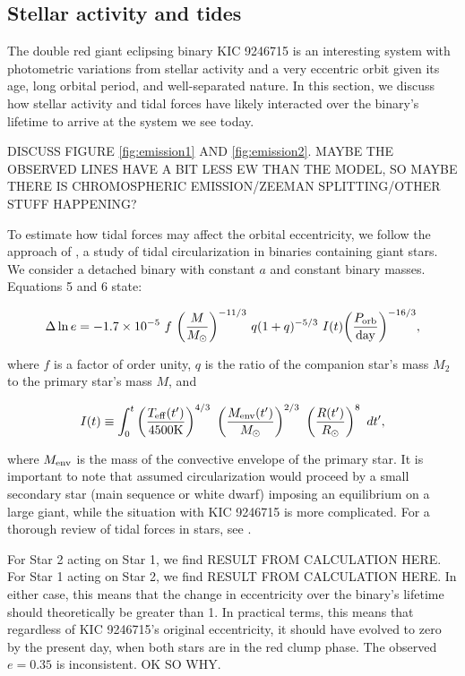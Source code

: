 \subsection{Stellar activity and tides}\label{context}
The double red giant eclipsing binary KIC 9246715 is an interesting system with photometric variations from stellar activity and a very eccentric orbit given its age, long orbital period, and well-separated nature. In this section, we discuss how stellar activity and tidal forces have likely interacted over the binary's lifetime to arrive at the system we see today.

DISCUSS FIGURE \ref{fig:emission1} AND \ref{fig:emission2}. MAYBE THE OBSERVED LINES HAVE A BIT LESS EW THAN THE MODEL, SO MAYBE THERE IS CHROMOSPHERIC EMISSION/ZEEMAN SPLITTING/OTHER STUFF HAPPENING?

To estimate how tidal forces may affect the orbital eccentricity, we follow the approach of \citet{ver95}, a study of tidal circularization in binaries containing giant stars. We consider a detached binary with constant $a$ and constant binary masses. Equations 5 and 6 \citep{ver95} state:

\begin{equation}\label{tide1}
\Delta \ln e = -1.7 \times 10^{-5} \ f \ {\left( \frac{M}{M_{\odot}} \right)}^{-11/3} \ q(1+q)^{-5/3} \ I(t) {\left( \frac{P_{\rm{orb}}}{\rm{day}} \right)}^{-16/3},
\end{equation}

where $f$ is a factor of order unity, $q$ is the ratio of the companion star's mass $M_2$ to the primary star's mass $M$, and

\begin{equation}
I(t) \equiv \int_0^t \left( \frac{T_{\rm{eff}}(t')}{4500 \rm{K}} \right)^{4/3} \ \left( \frac{M_{\rm{env}}(t')}{M_{\odot}} \right)^{2/3} \ \left( \frac{R(t')}{R_{\odot}} \right)^8 \ dt',
\end{equation}

where $M_{\rm{env}}$ is the mass of the convective envelope of the primary star. It is important to note that \citet{ver95} assumed circularization would proceed by a small secondary star (main sequence or white dwarf) imposing an equilibrium on a large giant, while the situation with KIC 9246715 is more complicated. For a thorough review of tidal forces in stars, see \citet{ogi14}.

For Star 2 acting on Star 1, we find RESULT FROM CALCULATION HERE. For Star 1 acting on Star 2, we find RESULT FROM CALCULATION HERE. In either case, this means that the change in eccentricity over the binary's lifetime should theoretically be greater than 1. In practical terms, this means that regardless of KIC 9246715's original eccentricity, it should have evolved to zero by the present day, when both stars are in the red clump phase. The observed $e = 0.35$ is inconsistent. OK SO WHY.

